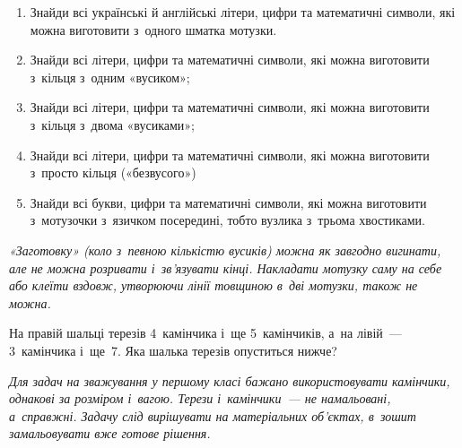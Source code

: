 \begin{enumerate}
    \item Знайди всі українські й англійські літери, цифри
    та математичні символи, які можна виготовити з~одного шматка мотузки.
    \item Знайди всі літери, цифри та математичні символи,
    які можна виготовити з~кільця з~одним «вусиком»;
    \item Знайди всі літери, цифри та математичні символи,
    які можна виготовити з~кільця з~двома «вусиками»;
    \item Знайди всі літери, цифри та математичні символи,
    які можна виготовити з~просто кільця («безвусого»)
    \item Знайди всі букви, цифри та математичні символи,
    які можна виготовити з~мотузочки з~язичком посередині,
    тобто вузлика з~трьома хвостиками.
\end{enumerate}

\emph{
«Заготовку» (коло з~певною кількістю вусиків) можна як завгодно вигинати,
але не можна розривати і~зв'язувати кінці.
Накладати мотузку саму на себе або клеїти вздовж,
утворюючи лінії товщиною в~дві мотузки, також не можна.
}


\problem
На правій шальці терезів 4~камінчика і~ще 5~камінчиків,
а~на лівій~--- 3~камінчика і~ще~7.
Яка шалька терезів опуститься нижче?

\emph{
Для задач на зважування у першому класі бажано використовувати
камінчики, однакові за розміром і~вагою.
Терези і~камінчики~--- не намальовані, а~справжні.
Задачу слід вирішувати на матеріальних об’єктах,
в~зошит замальовувати вже готове рішення.
}



